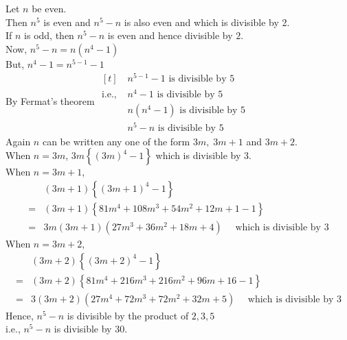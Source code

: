 \documentclass[12pt,class=book,crop=false]{standalone}
\begin{document}
\begin{soln}
    Let $ n $ be even.\\
    Then $ n^5 $ is even and $ n^5-n $ is also even and which is divisible by 2.\\
    If $ n $ is odd, then $ n^5-n $ is even and hence divisible by $ 2 $.\\
    Now, $ n^5-n =n(n^4-1)$\\
    But, $ n^4-1 =n^{5-1}-1$\\
    By Fermat's theorem $ \begin{aligned}[t]
                          & n^{5-1}-1 \text{ is divisible by } 5  \\
            \text{i.e., } & n^{4}-1 \text{ is divisible by } 5    \\
                          & n(n^{4}-1) \text{ is divisible by } 5 \\
                          & n^{5}-n \text{ is divisible by } 5
        \end{aligned} $\\
    Again $ n $ can be written any one of the form $ 3m,\;3m+1 $ and $ 3m+2 $.\\
    When $ n=3m $, $ 3m\left\{ (3m)^4-1 \right\} $ which is divisible by 3.\\
    When $ n=3m+1 $,
    \begin{align*}
          & (3m+1)\left\{ (3m+1)^4-1 \right\}                                  \\
        = & (3m+1)\left\{ 81m^4+108m^3+54m^2+12m+1-1 \right\}                  \\
        = & 3m(3m+1)( 27m^3+36m^2+18m+4 ) \quad\text{ which is divisible by }3
    \end{align*}
    When $ n=3m+2 $,
    \begin{align*}
          & (3m+2)\left\{ (3m+2)^4-1 \right\}                                       \\
        = & (3m+2)\left\{ 81m^4+216m^3+216m^2+96m+16-1 \right\}                     \\
        = & 3(3m+2)( 27m^4+72m^3+72m^2+32m+5 ) \quad\text{ which is divisible by }3
    \end{align*}
    Hence,  $ n^5-n $ is divisible by the product of $ 2,3,5 $\\
    i.e.,  $ n^5-n $ is divisible by 30.
    
\end{soln}
\end{document}
